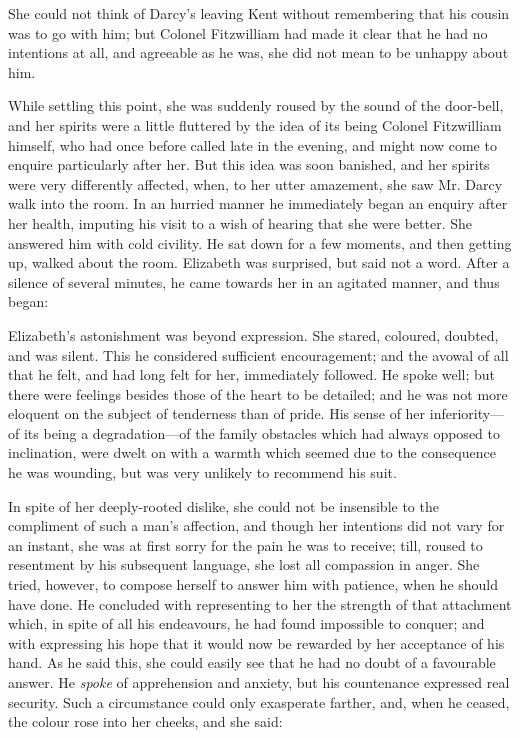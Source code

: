 She could not think of Darcy's leaving Kent without remembering that his cousin was to go with him; but Colonel Fitzwilliam had made it clear that he had no intentions at all, and agreeable as he was, she did not mean to be unhappy about him.

While settling this point, she was suddenly roused by the sound of the door-bell, and her spirits were a little fluttered by the idea of its being Colonel Fitzwilliam himself, who had once before called late in the evening, and might now come to enquire particularly after her. But this idea was soon banished, and her spirits were very differently affected, when, to her utter amazement, she saw Mr. Darcy walk into the room. In an hurried manner he immediately began an enquiry after her health, imputing his visit to a wish of hearing that she were better. She answered him with cold civility. He sat down for a few moments, and then getting up, walked about the room. Elizabeth was surprised, but said not a word. After a silence of several minutes, he came towards her in an agitated manner, and thus began:


Elizabeth's astonishment was beyond expression. She stared, coloured, doubted, and was silent. This he considered sufficient encouragement; and the avowal of all that he felt, and had long felt for her, immediately followed. He spoke well; but there were feelings besides those of the heart to be detailed; and he was not more eloquent on the subject of tenderness than of pride. His sense of her inferiority---of its being a degradation---of the family obstacles which had always opposed to inclination, were dwelt on with a warmth which seemed due to the consequence he was wounding, but was very unlikely to recommend his suit.

In spite of her deeply-rooted dislike, she could not be insensible to the compliment of such a man's affection, and though her intentions did not vary for an instant, she was at first sorry for the pain he was to receive; till, roused to resentment by his subsequent language, she lost all compassion in anger. She tried, however, to compose herself to answer him with patience, when he should have done. He concluded with representing to her the strength of that attachment which, in spite of all his endeavours, he had found impossible to conquer; and with expressing his hope that it would now be rewarded by her acceptance of his hand. As he said this, she could easily see that he had no doubt of a favourable answer. He {\em spoke} of apprehension and anxiety, but his countenance expressed real security. Such a circumstance could only exasperate farther, and, when he ceased, the colour rose into her cheeks, and she said:

